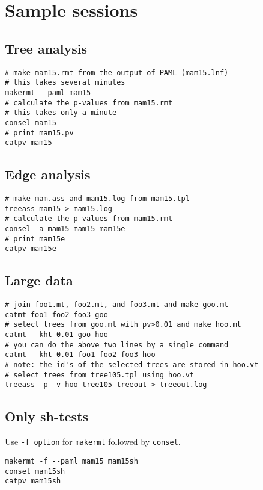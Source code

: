 \documentclass[12pt]{article}
\begin{document}
\section{Sample sessions} \label{sec:sample}

\subsection{Tree analysis}

\begin{verbatim}
# make mam15.rmt from the output of PAML (mam15.lnf)
# this takes several minutes
makermt --paml mam15
# calculate the p-values from mam15.rmt
# this takes only a minute
consel mam15
# print mam15.pv
catpv mam15
\end{verbatim}

\subsection{Edge analysis}

\begin{verbatim}
# make mam.ass and mam15.log from mam15.tpl
treeass mam15 > mam15.log
# calculate the p-values from mam15.rmt
consel -a mam15 mam15 mam15e
# print mam15e
catpv mam15e
\end{verbatim}

\subsection{Large data}

\begin{verbatim}
# join foo1.mt, foo2.mt, and foo3.mt and make goo.mt
catmt foo1 foo2 foo3 goo
# select trees from goo.mt with pv>0.01 and make hoo.mt
catmt --kht 0.01 goo hoo
# you can do the above two lines by a single command
catmt --kht 0.01 foo1 foo2 foo3 hoo 
# note: the id's of the selected trees are stored in hoo.vt
# select trees from tree105.tpl using hoo.vt
treeass -p -v hoo tree105 treeout > treeout.log
\end{verbatim}

\subsection{Only sh-tests}

Use {\tt -f option} for {\tt makermt} followed by {\tt consel}.
\begin{verbatim}
makermt -f --paml mam15 mam15sh
consel mam15sh
catpv mam15sh
\end{verbatim}
\end{document}
